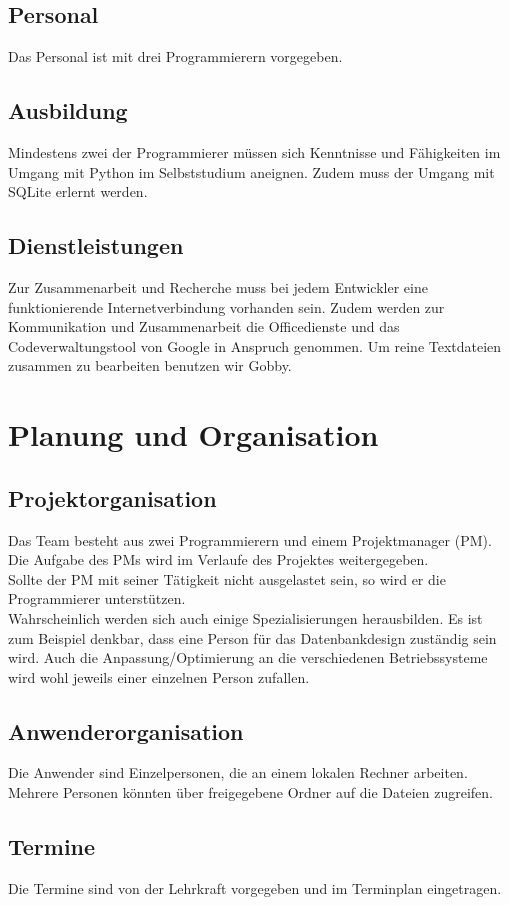 \documentclass[10pt,paper=a4,final]{scrartcl}
\begin{document}
\subsection{Personal}
Das Personal ist mit drei Programmierern vorgegeben.
\subsection{Ausbildung}
Mindestens zwei der Programmierer müssen sich Kenntnisse und Fähigkeiten im Umgang mit Python im Selbststudium aneignen.
Zudem muss der Umgang mit SQLite erlernt werden.
\subsection{Dienstleistungen}
Zur Zusammenarbeit und Recherche muss bei jedem Entwickler eine funktionierende Internetverbindung vorhanden sein.
Zudem werden zur Kommunikation und Zusammenarbeit die Officedienste und das Codeverwaltungstool von Google in Anspruch genommen. Um reine Textdateien zusammen zu bearbeiten benutzen wir Gobby.

\section{Planung und Organisation}
\subsection{Projektorganisation}
Das Team besteht aus zwei Programmierern und einem Projektmanager (PM).\\
Die Aufgabe des PMs wird im Verlaufe des Projektes weitergegeben.\\
Sollte der PM mit seiner Tätigkeit nicht ausgelastet sein, so wird er die Programmierer unterstützen.\\
Wahrscheinlich werden sich auch einige Spezialisierungen herausbilden. Es ist zum Beispiel denkbar, dass eine Person für das Datenbankdesign zuständig sein wird. Auch die Anpassung/Optimierung an die verschiedenen Betriebssysteme wird wohl jeweils einer einzelnen Person zufallen.
\subsection{Anwenderorganisation}
Die Anwender sind Einzelpersonen, die an einem lokalen Rechner arbeiten. Mehrere Personen könnten über freigegebene Ordner auf die Dateien zugreifen.
\subsection{Termine}
Die Termine sind von der Lehrkraft vorgegeben und im Terminplan eingetragen.
\end{document}
